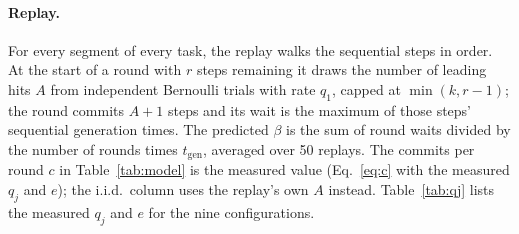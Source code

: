 \paragraph{Replay.}
For every segment of every task, the replay walks the sequential steps in
order. At the start of a round with $r$ steps remaining it draws the number of
leading hits $A$ from independent Bernoulli trials with rate $q_1$, capped at
$\min(k, r-1)$; the round commits $A{+}1$ steps and its wait is the maximum of
those steps' sequential generation times. The predicted $\beta$ is the sum of
round waits divided by the number of rounds times $t_{\mathrm{gen}}$, averaged
over 50 replays. The commits per round $c$ in Table~\ref{tab:model} is the
measured value (Eq.~\ref{eq:c} with the measured $q_j$ and $e$); the
i.i.d.\ column uses the replay's own $A$ instead. Table~\ref{tab:qj} lists the
measured $q_j$ and $e$ for the nine configurations.

